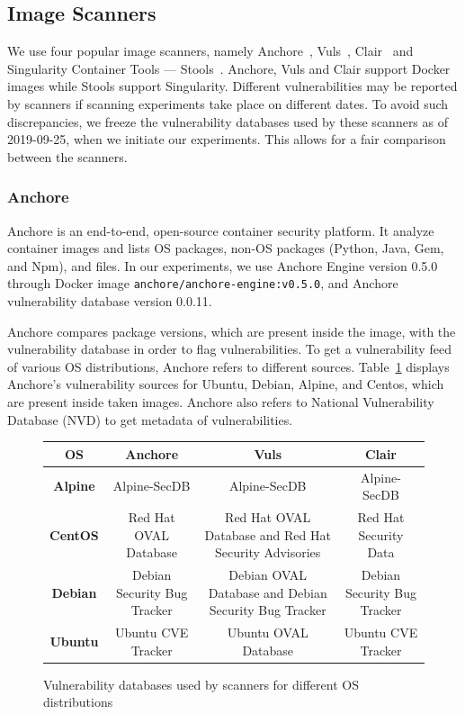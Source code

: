 \documentclass[a4paper,num-refs]{oup-contemporary}
\begin{document}
\subsection{Image Scanners}

We use four popular image scanners, namely Anchore~\cite{github_2019},
Vuls~\cite{future-architect_2019}, Clair~\cite{arminc_2019} and
Singularity Container Tools --- Stools~\cite{stools}. Anchore, Vuls and Clair support Docker
images while Stools support Singularity. Different vulnerabilities may be
reported by scanners if scanning experiments take place on different dates.
To avoid such discrepancies, we freeze the vulnerability
databases used by these scanners as of 2019-09-25, when we initiate our
experiments. This allows for a fair comparison between the scanners.

\subsubsection{Anchore}

Anchore is an end-to-end, open-source container security platform. It
analyze	container images and lists OS
packages, non-OS packages (Python, Java, Gem, and Npm), and files.
In our experiments, we use Anchore Engine version 0.5.0 through Docker image \texttt{anchore/anchore-engine:v0.5.0}, and
Anchore vulnerability database version 0.0.11.

Anchore compares package versions, which are present inside the
image, with the vulnerability database in order to flag vulnerabilities.
To get a vulnerability feed of various OS distributions, Anchore refers to
different sources. Table~\ref{database} displays Anchore's vulnerability sources for
Ubuntu, Debian, Alpine, and Centos, which are present inside taken images.
Anchore also refers to National
Vulnerability Database (NVD) to get metadata of vulnerabilities.

\begin{figure}
\begin{tabular}{|c|c|c|c|}
 \hline
\textbf{OS} &	\textbf{Anchore} &	\textbf{Vuls} &	\textbf{Clair} \\
\hline
	\textbf{Alpine} & Alpine-SecDB &	Alpine-SecDB &	Alpine-SecDB \\
\hline
	\textbf{CentOS} & Red Hat OVAL Database & Red Hat OVAL Database and Red Hat Security Advisories & Red Hat Security Data \\
\hline
	\textbf{Debian} & Debian Security Bug Tracker &	Debian OVAL Database and Debian Security Bug Tracker & Debian Security Bug Tracker \\
\hline
	\textbf{Ubuntu} & Ubuntu CVE Tracker &	Ubuntu OVAL Database &	Ubuntu CVE Tracker \\
 \hline
\end{tabular}
\caption{Vulnerability databases used by scanners for different OS distributions}
\label{database}
\end{figure}
\end{document}
